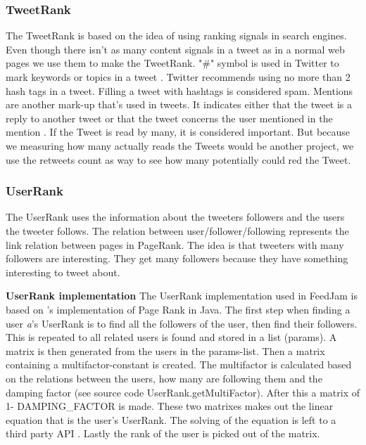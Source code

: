 \subsubsection{TweetRank}
The TweetRank is based on the idea of using ranking signals in search engines. Even though there isn't as many content signals in a tweet as in a normal web pages we use them to make the TweetRank. "\#" symbol is used in Twitter to mark keywords or topics in a tweet \citep{Twitter}. Twitter recommends using no more than 2 hash tags in a tweet. Filling a tweet with hashtags  is considered spam.
Mentions are another mark-up that's used in tweets. It indicates either that the tweet is a reply to another tweet or that the tweet concerns the user mentioned in the mention \citep{Twitterb}.
If the Tweet is read by many, it is considered important. But because we measuring how many actually reads the Tweets would be another project, we use the retweets count as way to see how many potentially could red the Tweet.

\subsubsection{UserRank}
The UserRank uses the information about the tweeters followers and the users the tweeter follows. The relation between user/follower/following represents the link relation between pages in PageRank. The idea is that tweeters with many followers are interesting. They get many followers because they have something interesting to tweet about. \newline

{\bf UserRank implementation}\newline
The UserRank implementation used in FeedJam is based on \citet{Goodrarzi2009}'s implementation of Page Rank in Java. The first step when finding a user \emph{a}'s UserRank is to find all the followers of the user, then find their followers. This is repeated to all related users is found and stored in a list (params). A matrix is then generated from the users in the params-list. Then a matrix containing a multifactor-constant is created. The multifactor is calculated based on the relations between the users, how many are following them and the damping factor (see source code UserRank.getMultiFactor). After this a matrix of 1- DAMPING\_FACTOR is made. These two matrixes makes out the linear equation that is the user's UserRank. The solving of the equation is left to a third party API \citep{Jama}. Lastly the rank of the user is picked out of the matrix. 



